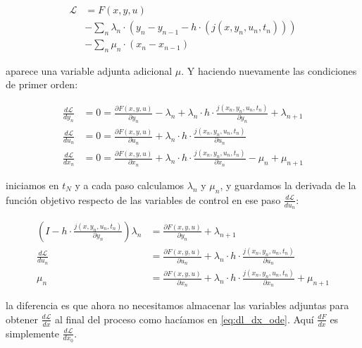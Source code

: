 \begin{align}
	\mathcal{L} & = F(x, y, u) \nonumber                                                             \\
	            & - \sum_n \lambda_n \cdot (y_n - y_{n-1} - h \cdot (j(x, y_n, u_n, t_n))) \nonumber \\
	            & - \sum_n \mu_n \cdot (x_n - x_{n-1}) \label{eq:ode_augmented_lagrangian}
\end{align}

aparece una variable adjunta adicional $\mu$. Y haciendo nuevamente las
condiciones de primer orden:

\begin{align}
	\frac{d\mathcal{L}}{dy_n} & = 0 = \frac{\partial F(x, y, u)}{\partial y_n} - \lambda_n + \lambda_n \cdot h \cdot \frac{j(x_n, y_n, u_n, t_n)}{\partial y_n} + \lambda_{n+1} \\
	\frac{d\mathcal{L}}{du_n} & = 0 = \frac{\partial F(x, y, u)}{\partial u_n} + \lambda_n \cdot h \cdot \frac{j(x_n, y_n, u_n, t_n)}{\partial u_n}                             \\
	\frac{d\mathcal{L}}{dx_n} & = 0 = \frac{\partial F(x, y, u)}{\partial x_n} + \lambda_n \cdot h \cdot \frac{j(x_n, y_n, u_n, t_n)}{\partial x_n} - \mu_n + \mu_{n+1}
\end{align}

iniciamos en $t_N$ y a cada paso calculamos $\lambda_n$ y $\mu_n$, y guardamos
la derivada de la función objetivo respecto de las variables de control en ese
paso $\frac{d\mathcal{L}}{du_n}$:

\begin{align}
	\left(I - h \cdot \frac{j(x, y_n, u_n, t_n)}{\partial y_n} \right) \lambda_n & = \frac{\partial F(x, y, u)}{\partial y_n} + \lambda_{n+1}                                                                  \\
	\frac{d\mathcal{L}}{du_n}                                                    & = \frac{\partial F(x, y, u)}{\partial u_n} + \lambda_n \cdot h \cdot \frac{j(x_n, y_n, u_n, t_n)}{\partial u_n}             \\
	\mu_n                                                                        & = \frac{\partial F(x, y, u)}{\partial x_n} + \lambda_n \cdot h \cdot \frac{j(x_n, y_n, u_n, t_n)}{\partial x_n} + \mu_{n+1}
\end{align}

la diferencia es que ahora no necesitamos almacenar las variables adjuntas para
obtener $\frac{d\mathcal{L}}{dx}$ al final del proceso como hacíamos en
\eqref{eq:dl_dx_ode}. Aquí $\frac{dF}{dx}$ es simplemente
$\frac{d\mathcal{L}}{dx_0}$.

